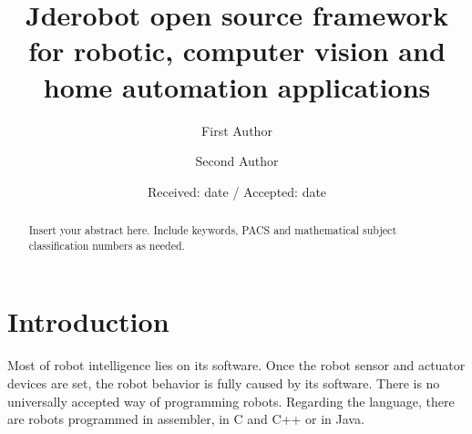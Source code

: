 \documentclass[twocolumn]{svjour3}          %
\begin{document}
\title{Jderobot open source framework for robotic, computer vision and home automation applications
}


\author{First Author         \and
        Second Author %
}



\date{Received: date / Accepted: date}


\maketitle

\begin{abstract}
Insert your abstract here. Include keywords, PACS and mathematical
subject classification numbers as needed.
\end{abstract}

\section{Introduction}
\label{intro}

Most of robot intelligence lies on its software. Once the robot sensor
and actuator devices are set, the robot behavior is fully caused by
its software. There is no universally accepted way of programming
robots. Regarding the language, there are robots programmed in assembler, in C and C++ or in Java. 
\end{document}
